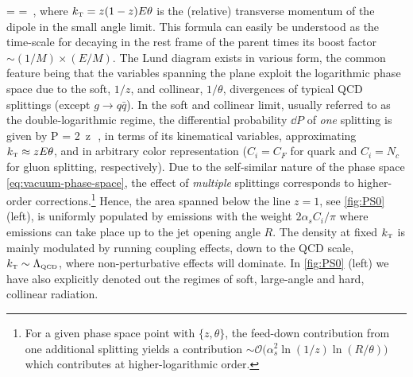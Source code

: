 \beq
\label{eq:FormationTime}
\tform =  =  \,,
\eeq
where 
$k_{\text{\tiny T}} = z(1-z) E \theta$ is the (relative) transverse momentum of the dipole in the small angle limit. 
This formula can easily be understood as the time-scale for decaying in the rest frame of the parent times its boost factor $\sim (1/M) \times (E/M)$. 
The Lund diagram exists in various form, the common feature being that the variables spanning the plane exploit the logarithmic phase space due to the soft, $1/z$, and collinear, $1/\theta$, divergences of typical QCD splittings (except $g \to q\bar q $).
In the soft and collinear limit, usually referred to as the double-logarithmic regime, the differential probability $\dd P$ of 
{\sl one} splitting is given by \cite{Dokshitzer:1991wu,Ellis:1991qj}
\beq
\label{eq:vacuum-phase-space}
\dd P = 2\, \dd \log z\theta \, \dd \log{} \,,
\eeq
in terms of its kinematical variables, approximating $k_{\text{\tiny T}} \approx z E \theta$, and
in arbitrary color representation ($C_i=C_F$ for quark and $C_i = N_c$ for gluon splitting, respectively). Due to the self-similar nature of the phase space \eqref{eq:vacuum-phase-space}, the effect of {\sl multiple} splittings corresponds to higher-order corrections.\footnote{For a given phase space point with $\{z,\theta\}$, the feed-down contribution from one additional splitting yields a contribution $\sim \mathcal{O}\big(\alpha_s^2 \ln (1/z) \ln (R/\theta)\big)$ which contributes at higher-logarithmic order.} Hence, the area spanned below the line $z=1$, see \autoref{fig:PS0} (left), is uniformly populated by emissions with the weight $2\alpha_s C_i/\pi$ where emissions can take place up to the jet opening angle $R$. The density at fixed $k_{\text{\tiny T}}$ is mainly modulated by running coupling effects, down to the QCD scale, $k_{\text{\tiny T}} \sim \Lambda_\text{\tiny  QCD}$, where non-perturbative effects will dominate. 
In \autoref{fig:PS0} (left) we have also explicitly denoted out the regimes of soft, large-angle  and hard, collinear radiation. 

